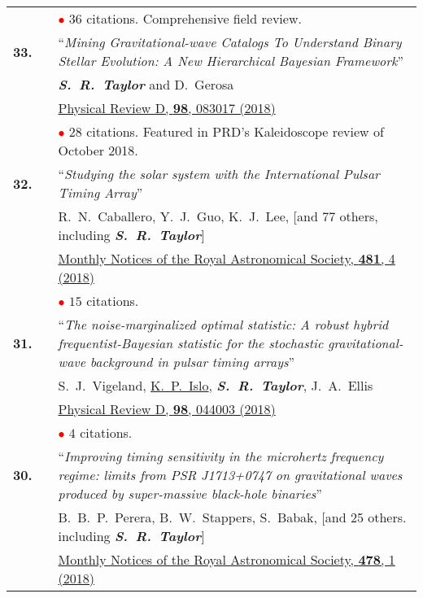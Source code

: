\documentclass[11pt,letterpaper,sans]{moderncv}
\begin{document}
{\begin{longtable}{rp{0.3cm}p{15.8cm}}
&& \textcolor{red}{$\bullet$} $36$ citations. Comprehensive field review. \vspace{0.09cm}\\
\textbf{33.} & & ``\textit{Mining Gravitational-wave Catalogs To Understand Binary Stellar Evolution: A New Hierarchical Bayesian Framework}'' \\ 
&&\textit{\textbf{S.~R.~Taylor}} and D.~Gerosa \\
&& \href{https://journals.aps.org/prd/abstract/10.1103/PhysRevD.98.083017}{{\color{color1} Physical Review D, \textbf{98}, 083017 (2018)}} \\
&& \textcolor{red}{$\bullet$} $28$ citations. Featured in PRD's Kaleidoscope review of October 2018. \vspace{0.09cm}\\
\textbf{32.} & & ``\textit{Studying the solar system with the International Pulsar Timing Array}'' \\ 
&&R.~N.~Caballero, Y.~J.~Guo, K.~J.~Lee, [and 77 others, including  \textit{\textbf{S.~R.~Taylor}}]\\
&& \href{https://academic.oup.com/mnras/article-abstract/481/4/5501/5113478?redirectedFrom=fulltext}{{\color{color1} Monthly Notices of the Royal Astronomical Society, \textbf{481}, 4 (2018)}}  \\
&& \textcolor{red}{$\bullet$} $15$ citations. \vspace{0.09cm}\\
\textbf{31.} & & ``\textit{The noise-marginalized optimal statistic: A robust hybrid frequentist-Bayesian statistic for the stochastic gravitational-wave background in pulsar timing arrays}'' \\ 
&&S.~J.~Vigeland, \underline{K.~P.~Islo}, \textit{\textbf{S.~R.~Taylor}}, J.~A.~Ellis \\
&& \href{https://journals.aps.org/prd/abstract/10.1103/PhysRevD.98.044003}{{\color{color1} Physical Review D, \textbf{98}, 044003 (2018)}}  \\
&& \textcolor{red}{$\bullet$} $4$ citations. \vspace{0.09cm}\\
\textbf{30.} & & ``\textit{Improving timing sensitivity in the microhertz frequency regime: limits from PSR J1713+0747 on gravitational waves produced by super-massive black-hole binaries}'' \\ 
&&B.~B.~P.~Perera, B.~W.~Stappers, S.~Babak, [and 25 others. including \textit{\textbf{S.~R.~Taylor}}]\\
&& \href{https://academic.oup.com/mnras/article-abstract/478/1/218/4990951?redirectedFrom=fulltext}{{\color{color1} Monthly Notices of the Royal Astronomical Society, \textbf{478}, 1 (2018)}}  \\

\end{longtable}}
\end{document}
